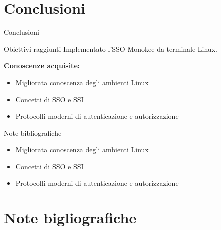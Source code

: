 \documentclass{beamer}
\begin{document}
	

	\section{Conclusioni}
	\begin{frame}{Conclusioni}
		
		\begin{exampleblock}{Obiettivi raggiunti}
			Implementato l'SSO Monokee da terminale Linux.
		\end{exampleblock}
				
		\vspace{.5em} \textbf{Conoscenze acquisite:} \vspace{.5em}
		\begin{itemize}
			\item Migliorata conoscenza degli ambienti Linux \vspace{.5em}
			\item Concetti di SSO e SSI \vspace{.5em}
			\item Protocolli moderni di autenticazione e autorizzazione \vspace{.5em}
		\end{itemize}
	
	\end{frame}
	
	\begin{frame}{Note bibliografiche}
		
		\begin{itemize}
			\item Migliorata conoscenza degli ambienti Linux \vspace{.5em}
			\item Concetti di SSO e SSI \vspace{.5em}
			\item Protocolli moderni di autenticazione e autorizzazione \vspace{.5em}
		\end{itemize}
	
	\end{frame}
	\section{Note bigliografiche}





\end{document}
